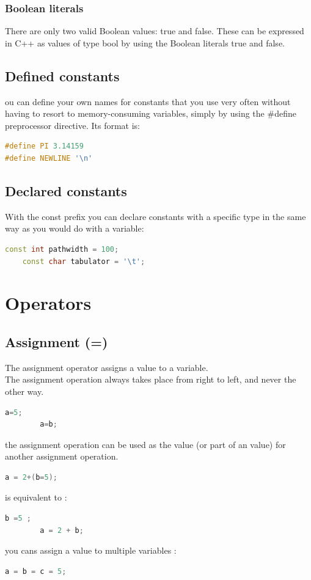 \documentclass[12pt,oneside]{book}
\begin{document}
\subsubsection{Boolean literals}
There are only two valid Boolean values: true and false. These can be expressed in C++ as values of type bool by
using the Boolean literals true and false.
\subsection{Defined constants}
ou can define your own names for constants that you use very often without having to resort to memory-consuming variables, simply by using the \#define preprocessor directive. Its format is:
\begin{lstlisting}[language=C++]
#define PI 3.14159
#define NEWLINE '\n'
\end{lstlisting}
\subsection{Declared constants}
With the const prefix you can declare constants with a specific type in the same way as you would do with a variable:
\begin{lstlisting}[language=C++]
    const int pathwidth = 100; 
    const char tabulator = '\t';
\end{lstlisting}
\section{Operators}
\subsection{Assignment (=)}
The assignment operator assigns a value to a variable.\\
The assignment operation always takes place from right to left, and never the other way.
	\begin{lstlisting}[language=C++]
        a=5;
        a=b;
    \end{lstlisting}
the assignment operation can be used as the value (or part of an value) for another assignment operation.
	\begin{lstlisting}[language=C++]
        a = 2+(b=5);
    \end{lstlisting}
is equivalent to :
\begin{lstlisting}[language=C++]
        b =5 ;
        a = 2 + b;
    \end{lstlisting}
you cans assign a value to multiple variables :
\begin{lstlisting}[language=C++]
        a = b = c = 5;
    \end{lstlisting}
\end{document}
